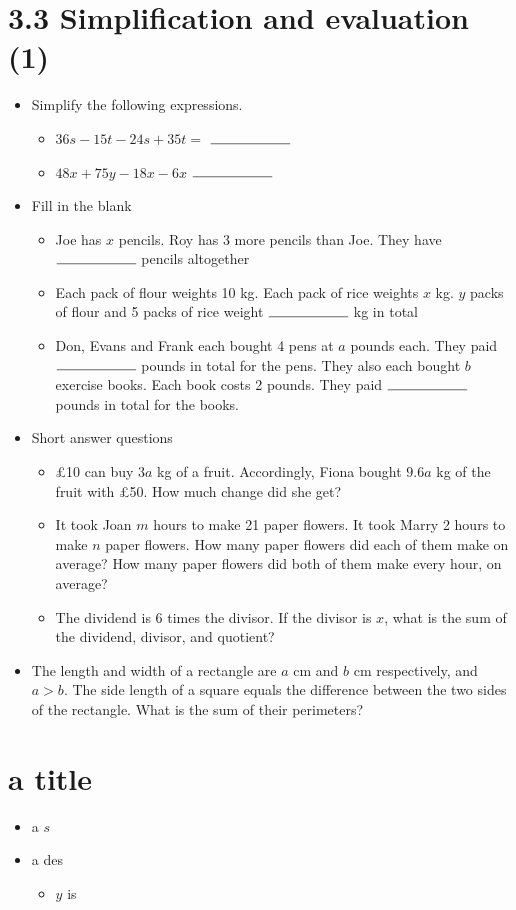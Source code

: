 \documentclass{article}%
\begin{document}
%
\section*{3.3 Simplification and evaluation (1)}%
\begin{itemize}%
\item%
Simplify the following expressions.%
\begin{itemize}%
\item%
$36s-15t-24s+35t=$ $\rule{2cm}{0.15mm}$%
\item%
$48x+75y-18x-6x$ $\rule{2cm}{0.15mm}$%
\end{itemize}%
\item%
Fill in the blank%
\begin{itemize}%
\item%
Joe has $x$ pencils. Roy has 3 more pencils than Joe. They have $\rule{2cm}{0.15mm}$ pencils altogether%
\item%
Each pack of flour weights 10 kg. Each pack of rice weights $x$ kg. $y$ packs of flour and 5 packs of rice weight $\rule{2cm}{0.15mm}$ kg in total%
\item%
Don, Evans and Frank each bought 4 pens at $a$ pounds each. They paid $\rule{2cm}{0.15mm}$ pounds in total for the pens. They also each bought $b$ exercise books. Each book costs 2 pounds. They paid $\rule{2cm}{0.15mm}$ pounds in total for the books.%
\end{itemize}%
\item%
Short answer questions%
\begin{itemize}%
\item%
\pounds10 can buy $3a$ kg of a fruit. Accordingly, Fiona bought $9.6a$ kg of the fruit with \pounds50. How much change did she get?%
\item%
It took Joan $m$ hours to make 21 paper flowers. It took Marry 2 hours to make $n$ paper flowers. How many paper flowers did each of them make on average? How many paper flowers did both of them make every hour, on average?%
\item%
The dividend is 6 times the divisor. If the divisor is $x$, what is the sum of the dividend, divisor, and quotient?%
\end{itemize}%
\item%
The length and width of a rectangle are $a$ cm and $b$ cm respectively, and $a>b$. The side length of a square equals the difference between the two sides of the rectangle. What is the sum of their perimeters?%
\end{itemize}

%
\section*{a title}%
\begin{itemize}%
\item%
a $s$%
\item%
a des%
\begin{itemize}%
\item%
$y$ is%
\end{itemize}%
\end{itemize}

%
\end{document}
